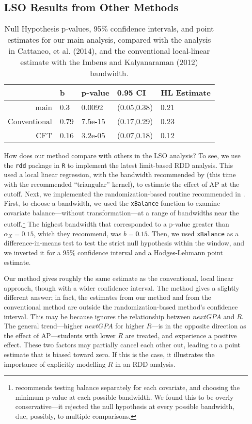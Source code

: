 \documentclass[12pt]{article}
\begin{document}
\subsection{LSO Results from Other Methods}
\begin{table}[ht]
\centering
\begin{tabular}{rllll}
  \hline
 & b & p-value & 0.95 CI & HL Estimate \\ 
  \hline
main & 0.3 & 0.0092 & (0.05,0.38) & 0.21 \\ 
  Conventional & 0.79 & 7.5e-15 & (0.17,0.29) & 0.23 \\ 
  CFT & 0.16 & 3.2e-05 & (0.07,0.18) & 0.12 \\ 
   \hline
\end{tabular}
\caption{Null Hypothesis p-values, 95\% confidence intervals, and point estimates for our main analysis, compared with the analysis in Cattaneo, et al. (2014), and the conventional local-linear estimate with the Imbens and Kalyanaraman (2012) bandwidth.} 
\label{alt}
\end{table}
How does our method compare with others in the LSO analysis?
To see, we use the \verb|rdd| package in \verb|R| \citep{rdd} to
implement the latest limit-based RDD analysis.
This used a local linear regression, with the bandwidth recommended by \citet{imbens2012optimal} (this time with the recommended ``triangular'' kernel), to estimate the effect of AP at the cutoff.
Next, we implemented the randomization-based routine recommended in \citet{rocio}.
First, to choose a bandwidth, we used the \verb|xBalance| function to examine covariate balance---without transformation---at a range of bandwidths near the cutoff.\footnote{\citet{rocio} recommends testing balance separately for each covariate, and choosing the minimum p-value at each possible bandwidth. We found this to be overly conservative---it rejected the null hypothesis at every possible bandwidth, due, possibly, to multiple comparisons.}
The highest bandwidth that corresponded to a p-value greater than $\alpha_X=0.15$, which they recommend, was $b=0.15$.
Then, we used \verb|xBalance| as a difference-in-means test to test the strict null hypothesis within the window, and we inverted it for a 95\% confidence interval and a Hodges-Lehmann point estimate.

Our method gives roughly the same estimate as the conventional, local linear approach, though with a wider confidence interval.
The \citet{rocio} method gives a slightly different answer; in fact, the estimates from our method and from the conventional method are outside the randomization-based method's confidence interval.%
This may be because \citet{rocio} ignores the relationship between $nextGPA$ and $R$.
The general trend---higher $nextGPA$ for higher $R$---is in the opposite direction as the effect of AP---students with lower $R$ are treated, and experience a positive effect.
These two factors may partially cancel each other out, leading to a point estimate that is biased toward zero.
If this is the case, it illustrates the importance of explicitly modelling $R$ in an RDD analysis.
\end{document}
